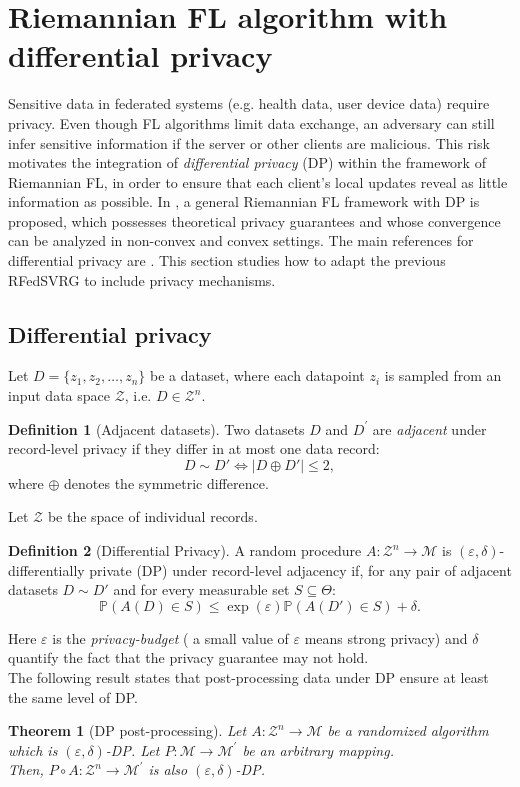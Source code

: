 \documentclass[10pt,a4paper]{book}
\theoremstyle{definition}
\newtheorem{defn}{Definition}[section]
\theoremstyle{plain}
\newtheorem{thm}{Theorem}[section]
\theoremstyle{remark}
\newcommand{\Prob}{\mathbb{P}}
\newcommand \M {\mathcal{M}}
\begin{document}
\section{Riemannian FL algorithm with differential privacy} Sensitive data in federated systems (e.g. health data, user device data) require privacy. Even though FL algorithms limit data exchange, an adversary can still infer sensitive information if the server or other clients are malicious. This risk motivates the integration of \emph{differential privacy} (DP) within the framework of Riemannian FL, in order to ensure that each client's local updates reveal as little information as possible.
In \cite{huang2024federated}, a general Riemannian FL framework with DP is proposed, which possesses theoretical privacy guarantees and whose convergence can be analyzed in non-convex and convex settings. 
The main references for differential privacy are \cite{dwork2010boosting,kairouz2015composition}. 
This section studies how to adapt the previous RFedSVRG to include privacy mechanisms.
\subsection{Differential privacy}
Let $D=\{z_1,z_2,\dots, z_n\}$ be a dataset, where each datapoint $z_i$ is sampled from an input data space $\mathcal{Z}$, i.e. $D\in \mathcal{Z}^{n}$. 

\begin{defn}[Adjacent datasets]
Two datasets $D$ and $D^{\prime}$ are \emph{adjacent} under record-level privacy if they differ in at most one data record:
$$D\sim D' \iff |D\oplus D'|\leq 2,$$
where $\oplus$ denotes the symmetric difference. 
\end{defn}
Let $\mathcal{Z}$ be the space of individual records.
\begin{defn}[Differential Privacy]
A random  procedure $A:\mathcal{Z}^{n}\to \M$ is $(\varepsilon,\delta)$-differentially private (DP) under record-level adjacency if, for any pair of adjacent datasets $D\sim D'$ and for every measurable set $S\subseteq\Theta$:
$$\Prob\left(A(D)\in S\right)\leq \exp(\varepsilon)\Prob(A(D')\in S)+\delta.$$
\end{defn}
Here $\varepsilon$ is the \emph{privacy-budget} ( a small value of $\varepsilon$ means strong privacy) and $\delta$ quantify the fact that the privacy guarantee may not hold.\\ The following result states that post-processing data under DP ensure at least the same level of DP.
\begin{thm}[DP post-processing]
Let $A:\mathcal{Z}^{n}\to \M$ be a randomized algorithm which is $(\varepsilon,\delta)$-DP. Let $P:\M \to \M^{\prime}$ be an arbitrary mapping. \\ Then, $P\circ A: \mathcal{Z}^{n}\to \mathcal{M}^{\prime}$ is also $(\varepsilon,\delta)$-DP.
\end{thm}
\end{document}
